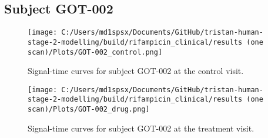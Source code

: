 \documentclass{epflreport}%
\begin{document}
\subsection{Subject GOT{-}002}%
\label{subsec:SubjectGOT{-}002}%

%


\begin{figure}[h!]%
\centering%
\texttt{[image: C:/Users/md1spsx/Documents/GitHub/tristan-human-stage-2-modelling/build/rifampicin\_clinical/results (one scan)/Plots/GOT-002\_control.png]}%
\caption{Signal{-}time curves for subject GOT{-}002 at the control visit.}%
\end{figure}

%


\begin{figure}[h!]%
\centering%
\texttt{[image: C:/Users/md1spsx/Documents/GitHub/tristan-human-stage-2-modelling/build/rifampicin\_clinical/results (one scan)/Plots/GOT-002\_drug.png]}%
\caption{Signal{-}time curves for subject GOT{-}002 at the treatment visit.}%
\end{figure}
\end{document}
